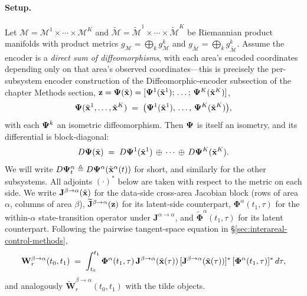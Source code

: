 \paragraph{Setup.}
Let $\mathcal{M}=\mathcal{M}^1\times\cdots\times\mathcal{M}^K$ and $\widetilde{\mathcal{M}}=\widetilde{\mathcal{M}}^1\times\cdots\times\widetilde{\mathcal{M}}^K$ be Riemannian product manifolds with product metrics $g_{\mathcal{M}}=\bigoplus_{k}g_{\mathcal{M}}^{k}$ and $g_{\widetilde{\mathcal{M}}}=\bigoplus_{k}g_{\widetilde{\mathcal{M}}}^{k}$. Assume the encoder is a \emph{direct sum of diffeomorphisms}, with each area's encoded coordinates depending only on that area's observed coordinates---this is precisely the per-subsystem encoder construction of the Diffeomorphic-encoder subsection of the chapter Methods section, $\vb{z}=\vb{\Psi}(\tilde{\vb{x}})=[\vb{\Psi}^{1}(\tilde{\vb{x}}^{1});\,\ldots;\,\vb{\Psi}^{K}(\tilde{\vb{x}}^{K})]$,
\begin{equation}
\vb{\Psi}(\tilde{\vb{x}}^{1},\ldots,\tilde{\vb{x}}^{K}) \;=\; \bigl(\vb{\Psi}^{1}(\tilde{\vb{x}}^{1}),\,\ldots,\,\vb{\Psi}^{K}(\tilde{\vb{x}}^{K})\bigr),
\end{equation}
with each $\vb{\Psi}^{k}$ an isometric diffeomorphism. Then $\vb{\Psi}$ is itself an isometry, and its differential is block-diagonal:
\begin{equation}
D\vb{\Psi}(\tilde{\vb{x}}) \;=\; D\vb{\Psi}^{1}(\tilde{\vb{x}}^{1})\,\oplus\,\cdots\,\oplus\,D\vb{\Psi}^{K}(\tilde{\vb{x}}^{K}).\label{eq:supp-interareal-control-blockdiagD}
\end{equation}
We will write $D\vb{\Psi}^{\alpha}_{t}\triangleq D\vb{\Psi}^{\alpha}(\tilde{\vb{x}}^{\alpha}(t))$ for short, and similarly for the other subsystems. All adjoints $(\cdot)^{*}$ below are taken with respect to the metric on each side. We write $\mathbf{J}^{\beta\to\alpha}(\tilde{\vb{x}})$ for the data-side cross-area Jacobian block (rows of area $\alpha$, columns of area $\beta$), $\widetilde{\mathbf{J}}^{\beta\to\alpha}(\vb{z})$ for its latent-side counterpart, $\mathbf{\Phi}^{\alpha}(t_{1},\tau)$ for the within-$\alpha$ state-transition operator under $\mathbf{J}^{\alpha\to\alpha}$, and $\widetilde{\mathbf{\Phi}}^{\alpha}(t_{1},\tau)$ for its latent counterpart. Following the pairwise tangent-space equation in \S\ref{sec:interareal-control-methods},
\begin{equation}
\mathbf{W}_{r}^{\beta\to\alpha}(t_{0},t_{1}) \;=\; \int_{t_{0}}^{t_{1}} \mathbf{\Phi}^{\alpha}(t_{1},\tau)\,\mathbf{J}^{\beta\to\alpha}(\tilde{\vb{x}}(\tau))\,[\mathbf{J}^{\beta\to\alpha}(\tilde{\vb{x}}(\tau))]^{*}\,[\mathbf{\Phi}^{\alpha}(t_{1},\tau)]^{*}\,d\tau,\label{eq:supp-interareal-control-Wreach}
\end{equation}
and analogously $\widetilde{\mathbf{W}}_{r}^{\beta\to\alpha}(t_{0},t_{1})$ with the tilde objects.

